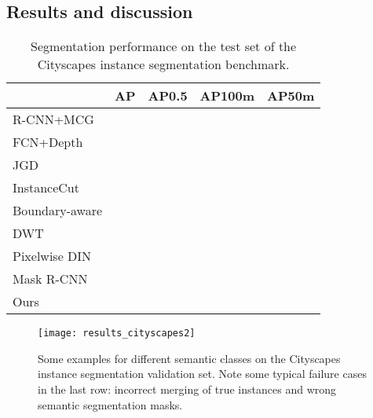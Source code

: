 \documentclass[10pt,twocolumn,letterpaper]{article}
\begin{document}
\subsection{Results and discussion}

\begin{table}
	\begin{center}
		\begin{tabular}{l|c|c|c|c}
			& AP & AP0.5 & AP100m & AP50m \\
			\hline
			R-CNN+MCG &  &  &  &  \\
			FCN+Depth &  &  &  &  \\
            JGD &  &  &  &  \\
            InstanceCut &  &  &  &  \\
            Boundary-aware &  &  &  &  \\
            DWT &  &  &  &  \\
            Pixelwise DIN &  &  &  &  \\
            Mask R-CNN &  &  &  &  \\
            \hline
			Ours &  &  &  &  \\
		\end{tabular}
	\end{center}
	\caption{Segmentation performance on the test set of the Cityscapes instance segmentation benchmark.}
	\label{tab:resultsCityscapes}
\end{table}

\begin{figure*}
	\begin{center}
		\texttt{[image: results\_cityscapes2]}
	\end{center}
	\caption{Some examples for different semantic classes on the Cityscapes instance segmentation validation set. Note some typical failure cases in the last row: incorrect merging of true instances and wrong semantic segmentation masks.}
	\label{fig:resultsCityscapes}
\end{figure*}
            
\end{document}
